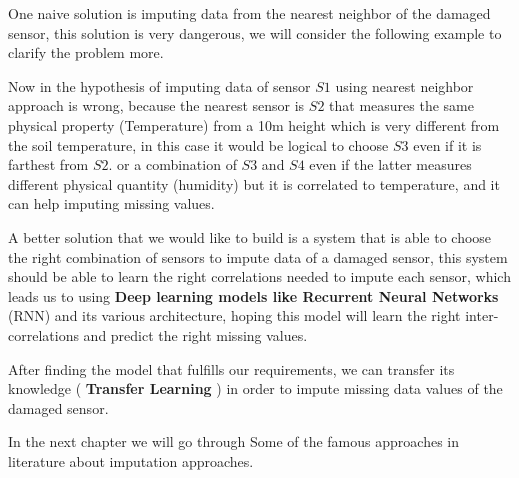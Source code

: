 One naive solution is imputing  data from the nearest neighbor of the damaged sensor, this solution is very dangerous, we will  consider the following example to clarify the problem more.

Now in the hypothesis of imputing data of sensor $S1$  using nearest neighbor approach is wrong, because the nearest  sensor is $S2$  that  measures the same physical property (Temperature)  from a 10m height  which is very different from the soil temperature, in this case it would be logical to choose $S3$ even if it is farthest from $S2$. or a combination of $S3$ and $S4$ even if the latter measures different physical quantity (humidity) but it is correlated to temperature, and it can help imputing missing values.

A better solution that we would like to build is a system that is able to choose the right combination of sensors to impute data of a damaged sensor, this system should be able to learn the right correlations needed to impute each sensor, which leads us to using \textbf{Deep learning models like Recurrent Neural Networks} (RNN) and its various architecture, hoping this model will learn the right inter-correlations and predict the right missing values.
  
After finding the model that fulfills our requirements, we can transfer its knowledge (\textbf{ Transfer Learning }) in order to impute missing data values of the damaged sensor.


In the next chapter we will go through Some of the famous approaches in literature about imputation approaches.






